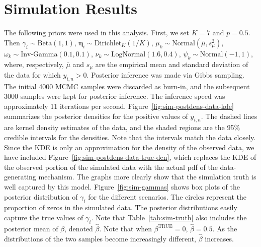 \documentclass[12pt]{article} %
\newcommand{\Normal}{\text{Normal}}
\newcommand{\Beta}{\text{Beta}}
\newcommand{\InvGamma}{\text{Inv-Gamma}}
\newcommand{\Dirichlet}{\text{Dirichlet}}
\newcommand{\LogNormal}{\text{LogNormal}}
\newcommand{\true}{\text{TRUE}}
\begin{document}
\section{Simulation Results}\label{sec:sim-results}
The following priors were used in this analysis. First, we set $K=7$ and
$p=0.5$. Then $\gamma_i\sim\Beta(1, 1)$, $\bm\eta_i\sim\Dirichlet_K(1/K)$,
$\mu_k\sim\Normal(\bar{\mu}, s_\mu^2)$, $\omega_k\sim\InvGamma(0.1, 0.1)$,
$\nu_k\sim\LogNormal(1.6, 0.4)$, $\psi_k\sim\Normal(-1, 1)$, where,
respectively, $\bar{\mu}$ and $s_\mu$ are the empirical mean
and standard deviation of the data for which $y_{i,n} > 0$. Posterior
inference was made via Gibbs sampling. The initial 4000 MCMC samples were
discarded as burn-in, and the subsequent 3000 samples were kept for
posterior inference.
%
%
The inference speed was approximately 11 iterations per second.
Figure~\ref{fig:sim-postdens-data-kde} summarizes the posterior densities for
the positive values of $y_{i,n}$. The dashed lines are kernel density
estimates of the data, and the shaded regions are the 95\% credible intervals
for the densities. Note that the intervals match the data closely.
%
Since the KDE is only an approximation for the density of the observed data,
we have included Figure~\ref{fig:sim-postdens-data-true-den}, which replaces
the KDE of the observed portion of the simulated data with the actual pdf of
the data-generating mechanism. The graphs more clearly show that the simulation
truth is well captured by this model. 
%
Figure~\ref{fig:sim-gammas} shows box plots of the posterior distribution of
$\gamma_i$ for the different scenarios. The circles represent the proportion
of zeros in the simulated data. The posterior distributions easily capture the
true values of $\gamma_i$.
%
Note that Table~\ref{tab:sim-truth} also includes the posterior mean of
$\beta$, denoted $\hat\beta$. Note that when $\beta^\true=0$,
$\hat\beta=0.5$. As the distributions of the two samples become increasingly
different, $\hat\beta$ increases.
\end{document}
